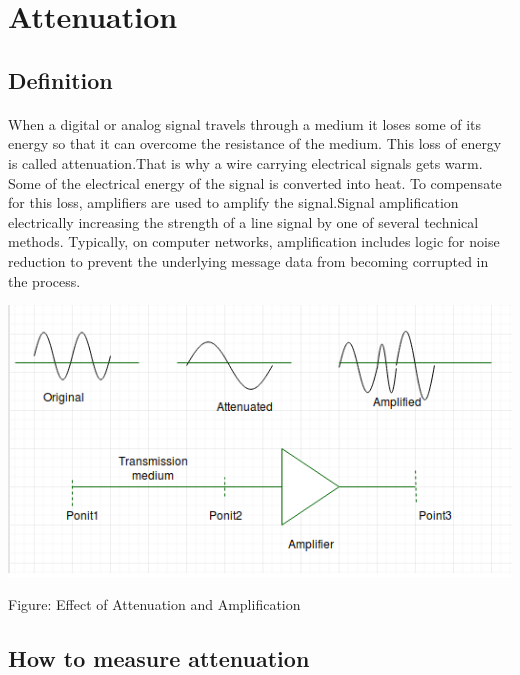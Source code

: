 \documentclass[12pt,a4paper]{article}%
\begin{document}
	\section{Attenuation}
	\begin{flushleft}
		
		\subsection{Definition} 
		\paragraph{}
		When a digital or analog signal travels through a medium it loses some of its energy so that it can overcome the resistance of the medium. This loss of energy is called attenuation.That is why a wire carrying electrical signals gets warm. Some of the electrical energy of the signal is converted into heat. To compensate for this loss, amplifiers are used to amplify the signal.Signal amplification electrically increasing the strength of a line signal by one of several technical methods. Typically, on computer networks, amplification includes logic for noise reduction to prevent the underlying message data from becoming corrupted in the process.
		
		\begin{center}
			\includegraphics[width=0.80 \textwidth]{./images/NKK1.png}
		\end{center}
		\begin{center}
			Figure: Effect of Attenuation and Amplification
		\end{center}
		
		\subsection{How to measure attenuation} 

\end{flushleft}
\end{document}
